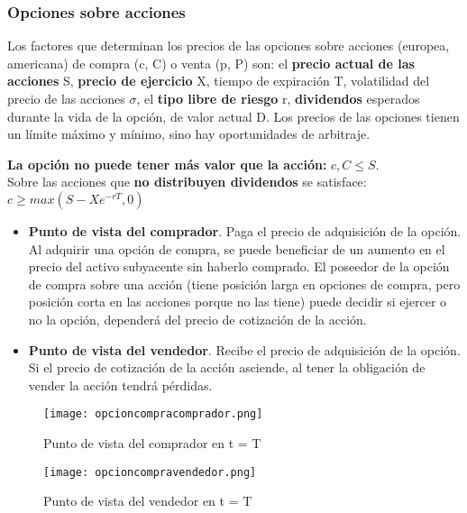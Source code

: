 \documentclass[
10pt, %
a4paper, %
oneside, %
headinclude,footinclude, %
BCOR5mm, %
]{scrartcl}
\newcommand{\n}[1]{\textbf{#1}}
\newcommand{\pot}[1]{^{#1}}
\newcommand{\f}[1]{{\large{${#1}$}}}
\newcounter{ex}
\begin{document}
		\subsubsection{Opciones sobre acciones}
		
			Los factores que determinan los precios de las opciones sobre acciones (europea, americana) de compra (c, C) o venta (p, P) son: el \n{precio actual de las acciones} S, \n{precio de ejercicio} X, tiempo de expiración T, volatilidad del precio de las acciones \f{\sigma}, el \n{tipo libre de riesgo} r, \n{dividendos} esperados durante la vida de la opción, de valor actual D. Los precios de las opciones tienen un límite máximo y mínimo, sino hay oportunidades de arbitraje.

			\vspace{-0.4cm}


			\n{La opción no puede tener más valor que la acción:} \f{c,C \leq S}. \\Sobre las acciones que \n{no distribuyen dividendos} se satisface: \f{c \geq max(S-Xe\pot{-rT}, 0)}


			\begin{itemize}
				\item \n{Punto de vista del comprador}. Paga el precio de adquisición de la opción. Al adquirir una opción de compra, se puede beneficiar de un aumento en el precio del activo subyacente sin haberlo comprado. El poseedor de la opción de compra sobre una acción (tiene posición larga en opciones de compra, pero posición corta en las acciones porque no las tiene) puede decidir si ejercer o no la opción, dependerá del precio de cotización de la acción.

				\item \n{Punto de vista del vendedor}. Recibe el precio de adquisición de la opción. Si el precio de cotización de la acción asciende, al tener la obligación de vender la acción tendrá pérdidas.
			
			\end{itemize}
				
					\begin{figure}[h!]
						\begin{multicols}{2}
						\texttt{[image: opcioncompracomprador.png]}
						\caption{Punto de vista del comprador en t = T}

						\breakcolumn
						\texttt{[image: opcioncompravendedor.png]}
						\caption{Punto de vista del vendedor en t = T}
						\end{multicols}
					\end{figure}
\end{document}
